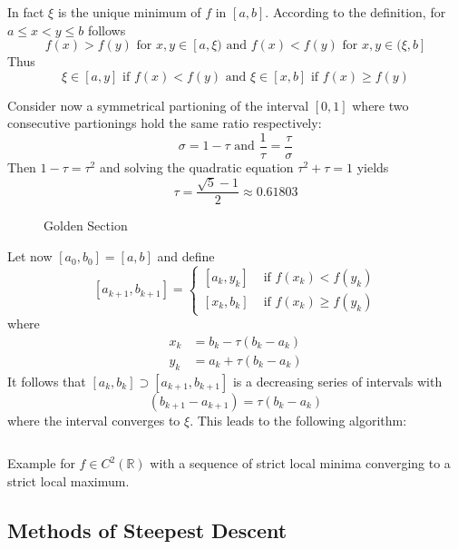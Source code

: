 In fact \( \xi \) is the unique minimum of \( f \) in \( [a, b] \). According to the definition,
for \( a \le x < y \le b \) follows
\[
    f(x) > f(y) \text{ for } x, y \in [a, \xi) \text{ and } f(x) < f(y) \text{ for }  x, y \in (\xi, b]   %
\]
Thus
\[
    \xi \in [a, y] \text{ if } f(x) < f(y) \text{ and } \xi \in [x, b] \text{ if } f(x) \ge f(y)
\]

Consider now a symmetrical partioning of the interval \( [0, 1] \) where two consecutive partionings hold
the same ratio respectively:
\[
    \sigma = 1 - \tau \text{ and } \frac{1}{\tau} = \frac{\tau}{\sigma}
\]
Then \( 1 - \tau = \tau^2 \) and solving the quadratic equation \( \tau^2 + \tau = 1 \) yields
\[
    \tau = \frac{\sqrt{5} - 1}{2} \approx 0.61803
\]
\bigskip

\begin{figure}[H]
    \centering
    \plotgoldensection{}
    \caption{Golden Section}\label{fig:golden_section}
\end{figure}
\bigskip

Let now \( [a_0, b_0] = [a, b] \) and define
\[
    [a_{k + 1}, b_{k + 1}] =
    \begin{cases}
        [a_k, y_k] & \text{ if } f(x_k) < f(y_k)   \\
        [x_k, b_k] & \text{ if } f(x_k) \ge f(y_k)
    \end{cases}
\]
where
\[
    \begin{split}
        x_k & = b_k - \tau (b_k - a_k) \\
        y_k & = a_k + \tau (b_k - a_k)
    \end{split}
\]
It follows that \( [a_k, b_k] \supset [a_{k + 1}, b_{k + 1}] \) is a decreasing series of intervals with
\[
    (b_{k + 1} - a_{k + 1}) =  \tau(b_k - a_k)
\]
where the interval converges to \( \xi \). This leads to the following algorithm:
\bigskip

\begin{algorithm}\label{algo:golden_section_search}
\end{algorithm}
\inputminted[fontsize=\small, framesep=0.35cm, frame=lines, python3=true]{python}{notebook/golden_section.py}
\bigskip

\begin{exercise}
    Example for \( f \in C^2(\mathbb{R}) \) with a sequence of strict local minima converging to a strict local maximum.
\end{exercise}
\bigskip


\subsection{Methods of Steepest Descent}
\bigskip


